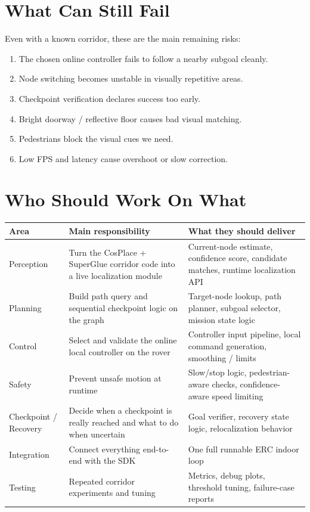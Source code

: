 \documentclass[11pt,a4paper]{article}
\begin{document}
\section{What Can Still Fail}

Even with a known corridor, these are the main remaining risks:

\begin{enumerate}[nosep]
  \item The chosen online controller fails to follow a nearby subgoal cleanly.
  \item Node switching becomes unstable in visually repetitive areas.
  \item Checkpoint verification declares success too early.
  \item Bright doorway / reflective floor causes bad visual matching.
  \item Pedestrians block the visual cues we need.
  \item Low FPS and latency cause overshoot or slow correction.
\end{enumerate}


\section{Who Should Work On What}

\begin{tabularx}{\textwidth}{p{} p{} X}
\toprule
\textbf{Area} & \textbf{Main responsibility} & \textbf{What they should deliver} \\
\midrule
Perception & Turn the CosPlace + SuperGlue corridor code into a live localization module & Current-node estimate, confidence score, candidate matches, runtime localization API \\
Planning & Build path query and sequential checkpoint logic on the graph & Target-node lookup, path planner, subgoal selector, mission state logic \\
Control & Select and validate the online local controller on the rover & Controller input pipeline, local command generation, smoothing / limits \\
Safety & Prevent unsafe motion at runtime & Slow/stop logic, pedestrian-aware checks, confidence-aware speed limiting \\
Checkpoint / Recovery & Decide when a checkpoint is really reached and what to do when uncertain & Goal verifier, recovery state logic, relocalization behavior \\
Integration & Connect everything end-to-end with the SDK & One full runnable ERC indoor loop \\
Testing & Repeated corridor experiments and tuning & Metrics, debug plots, threshold tuning, failure-case reports \\
\bottomrule
\end{tabularx}
\end{document}
